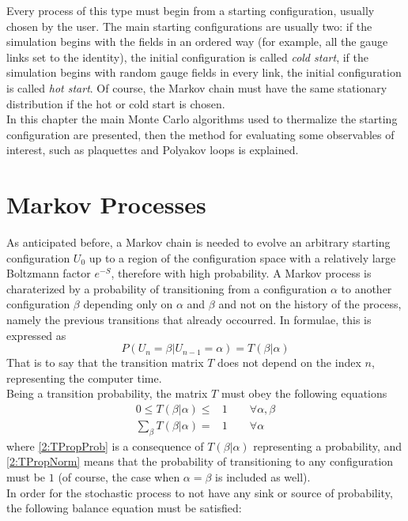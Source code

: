 Every process of this type must begin from a starting configuration, usually chosen by the user.
The main starting configurations are usually two: if the simulation begins with the fields in an ordered way (for example, all the gauge links set to the identity), the initial configuration is called \emph{cold start}, if the simulation begins with random gauge fields in every link, the initial configuration is called \emph{hot start}.
Of course, the Markov chain must have the same stationary distribution if the hot or cold start is chosen.\\
In this chapter the main Monte Carlo algorithms used to thermalize the starting configuration are presented, then the method for evaluating some observables of interest, such as plaquettes and Polyakov loops is explained.

\section{Markov Processes}
As anticipated before, a Markov chain is needed to evolve an arbitrary starting configuration $U_0$ up to a region of the configuration space with a relatively large Boltzmann factor $e^{-S}$, therefore with high probability.
A Markov process is charaterized by a probability of transitioning from a configuration $\alpha$ to another configuration $\beta$ depending only on $\alpha$ and $\beta$ and not on the history of the process, namely the previous transitions that already occourred.
In formulae, this is expressed as
\begin{equation}
    P(U_n=\beta|U_{n-1}=\alpha) = T(\beta|\alpha) \label{2:TransMatrix}
\end{equation}
That is to say that the transition matrix $T$ does not depend on the index $n$, representing the computer time.\\
Being a transition probability, the matrix $T$ must obey the following equations
\begin{align}
    0 \leq T(\beta|\alpha) \leq& 1 \qquad \forall \alpha,\beta \label{2:TPropProb} \\
    \sum_{\beta}T(\beta|\alpha) =& 1 \qquad \forall \alpha \label{2:TPropNorm}
\end{align}
where \eqref{2:TPropProb} is a consequence of $T(\beta|\alpha)$ representing a probability, and \eqref{2:TPropNorm} means that the probability of transitioning to any configuration must be $1$ (of course, the case when $\alpha=\beta$ is included as well).\\
In order for the stochastic process to not have any sink or source of probability, the following balance equation must be satisfied:
